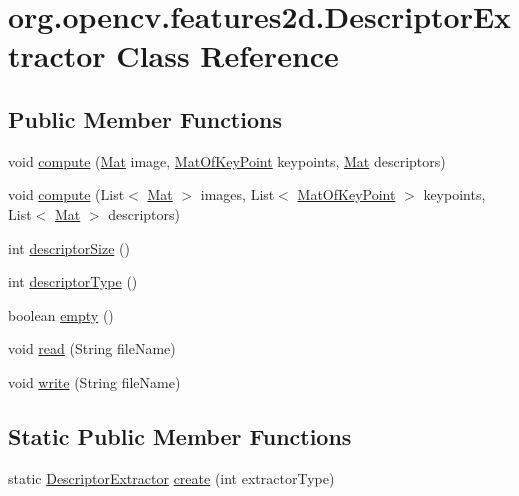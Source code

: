 \hypertarget{classorg_1_1opencv_1_1features2d_1_1_descriptor_extractor}{}\section{org.\+opencv.\+features2d.\+Descriptor\+Extractor Class Reference}
\label{classorg_1_1opencv_1_1features2d_1_1_descriptor_extractor}
\subsection*{Public Member Functions}
\begin{DoxyCompactItemize}
\item 
void \mbox{\hyperlink{classorg_1_1opencv_1_1features2d_1_1_descriptor_extractor_afed8df31872201e6e6e001a1e8be8df9}{compute}} (\mbox{\hyperlink{classorg_1_1opencv_1_1core_1_1_mat}{Mat}} image, \mbox{\hyperlink{classorg_1_1opencv_1_1core_1_1_mat_of_key_point}{Mat\+Of\+Key\+Point}} keypoints, \mbox{\hyperlink{classorg_1_1opencv_1_1core_1_1_mat}{Mat}} descriptors)
\item 
void \mbox{\hyperlink{classorg_1_1opencv_1_1features2d_1_1_descriptor_extractor_a9c1fad7c9e6052255289777b5a41bebe}{compute}} (List$<$ \mbox{\hyperlink{classorg_1_1opencv_1_1core_1_1_mat}{Mat}} $>$ images, List$<$ \mbox{\hyperlink{classorg_1_1opencv_1_1core_1_1_mat_of_key_point}{Mat\+Of\+Key\+Point}} $>$ keypoints, List$<$ \mbox{\hyperlink{classorg_1_1opencv_1_1core_1_1_mat}{Mat}} $>$ descriptors)
\item 
int \mbox{\hyperlink{classorg_1_1opencv_1_1features2d_1_1_descriptor_extractor_ace3eea1d18bd6aa3a14f2190c9e78d0b}{descriptor\+Size}} ()
\item 
int \mbox{\hyperlink{classorg_1_1opencv_1_1features2d_1_1_descriptor_extractor_a2aa67b3b66dd6b31944d1e490affe945}{descriptor\+Type}} ()
\item 
boolean \mbox{\hyperlink{classorg_1_1opencv_1_1features2d_1_1_descriptor_extractor_a0a1f0fe44bf8a7abb3d4ad8ec43de78d}{empty}} ()
\item 
void \mbox{\hyperlink{classorg_1_1opencv_1_1features2d_1_1_descriptor_extractor_ac82ce2557d69fefff8baed09d1a7abe8}{read}} (String file\+Name)
\item 
void \mbox{\hyperlink{classorg_1_1opencv_1_1features2d_1_1_descriptor_extractor_a7471115609875fd874fbf896309cab7d}{write}} (String file\+Name)
\end{DoxyCompactItemize}
\subsection*{Static Public Member Functions}
\begin{DoxyCompactItemize}
\item 
static \mbox{\hyperlink{classorg_1_1opencv_1_1features2d_1_1_descriptor_extractor}{Descriptor\+Extractor}} \mbox{\hyperlink{classorg_1_1opencv_1_1features2d_1_1_descriptor_extractor_a07e4b587ceb856176699c4947611b5f6}{create}} (int extractor\+Type)
\end{DoxyCompactItemize}

